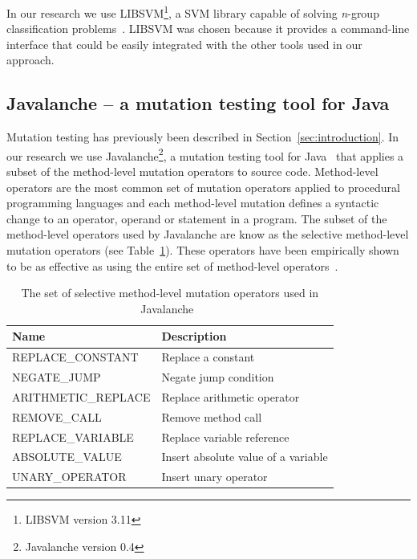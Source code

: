 \documentclass[conference]{IEEEtran}
\begin{document}
In our research we use LIBSVM\footnote{LIBSVM version 3.11}, a SVM library capable of solving \emph{n}-group classification problems~\cite{CL11}. LIBSVM was chosen because it provides a command-line interface that could be easily integrated with the other tools used in our approach.


\subsection{Javalanche -- a mutation testing tool for Java}
\label{subsec:javalanche}
Mutation testing has previously been described in Section~\ref{sec:introduction}. In our research we use Javalanche\footnote{Javalanche version 0.4}, a mutation testing tool for Java~\cite{SZ09} that applies a subset of the method-level mutation operators to source code. Method-level operators are the most common set of mutation operators applied to procedural programming languages and each method-level mutation defines a syntactic change to an operator, operand or statement in a program. The subset of the method-level operators used by Javalanche are know as the selective method-level mutation operators (see Table~\ref{tab:mutation_operators}). These operators have been empirically shown to be as effective as using the entire set of method-level operators~\cite{OLR+96}.

\begin{table}[!t]
  \centering
  \begin{tabular}{|l|l|}
    \hline
    \rowcolor[RGB]{169,196,223}
    \textbf{Name} & \textbf{Description} \\
    \hline REPLACE\_CONSTANT & Replace a constant \\
    \hline NEGATE\_JUMP & Negate jump condition \\
    \hline ARITHMETIC\_REPLACE & Replace arithmetic operator \\
    \hline REMOVE\_CALL & Remove method call \\
    \hline REPLACE\_VARIABLE & Replace variable reference\\
    \hline ABSOLUTE\_VALUE & Insert absolute value of a variable \\
    \hline UNARY\_OPERATOR & Insert unary operator \\
    \hline
  \end{tabular}
  \caption{The set of selective method-level mutation operators used in Javalanche~\cite{ OLR+96}}
  \label{tab:mutation_operators}
\end{table}
\end{document}
